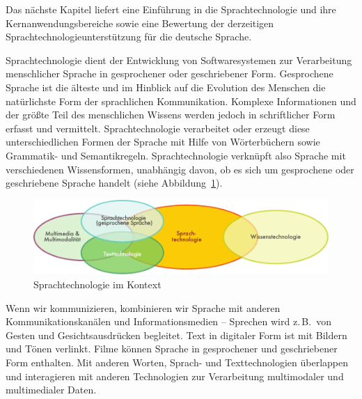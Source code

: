 \documentclass[]{../../metanetpaper}
\begin{document}
\begin{multicols}{2}
Das nächste Kapitel liefert eine Einführung in die Sprachtechnologie und ihre Kernanwendungsbereiche sowie eine Bewertung der derzeitigen Sprachtechnologieunterstützung für die deutsche Sprache.

\end{multicols}

\clearpage



\begin{multicols}{2}

Sprachtechnologie dient der Entwicklung von Softwaresystemen zur Verarbeitung menschlicher Sprache in gesprochener oder geschriebener Form. Gesprochene Sprache ist die älteste und im Hinblick auf die Evolution des Menschen die natürlichste Form der sprachlichen Kommunikation. Komplexe Informationen und der größte Teil des menschlichen Wissens werden jedoch in schriftlicher Form erfasst und vermittelt. Sprachtechnologie verarbeitet oder erzeugt diese unterschiedlichen Formen der Sprache mit Hilfe von Wörterbüchern sowie Grammatik- und Semantikregeln. Sprachtechnologie verknüpft also Sprache mit verschiedenen Wissensformen, unabhängig davon, ob es sich um gesprochene oder geschriebene Sprache handelt (siehe Abbildung~\ref{fig:ltincontext_de}).

\begin{figure}[htb]
  \vspace{-25mm}
  \center
  \includegraphics[width=\textwidth]{../_media/german/language_technologies}
  \caption{Sprachtechnologie im Kontext}
  \label{fig:ltincontext_de}
\end{figure}

Wenn wir kommunizieren, kombinieren wir Sprache mit anderen Kommunikationskanälen und Informationsmedien – Sprechen wird z.\,B.~von Gesten und Gesichtsausdrücken begleitet. Text in digitaler Form ist mit Bildern und Tönen verlinkt. Filme können Sprache in gesprochener und geschriebener Form enthalten. Mit anderen Worten, Sprach- und Texttechnologien überlappen und interagieren mit anderen Technologien zur Verarbeitung multimodaler und multimedialer Daten. 


\end{multicols}
\end{document}
